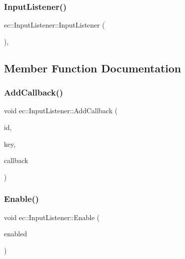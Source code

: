 \mbox{\label{classec_1_1_input_listener_aa44d25c2b2d3ef5e72611831fd66e10c}} 
\subsubsection{\texorpdfstring{Input\+Listener()}{InputListener()}}
{\footnotesize\ttfamily ec\+::\+Input\+Listener\+::\+Input\+Listener (\begin{DoxyParamCaption}{ }\end{DoxyParamCaption})\hspace{0.3cm}{\ttfamily [explicit]}, {\ttfamily [protected]}}



\subsection{Member Function Documentation}
\mbox{\label{classec_1_1_input_listener_abd10663298114e8790d695feab96b188}} 
\subsubsection{\texorpdfstring{Add\+Callback()}{AddCallback()}}
{\footnotesize\ttfamily void ec\+::\+Input\+Listener\+::\+Add\+Callback (\begin{DoxyParamCaption}\item[{const std\+::string \&}]{id,  }\item[{\mbox{\hyperlink{namespaceec_a5de6bdb8c4b2ed6e590e721ec998f964}{Event\+Key\+\_\+T}}}]{key,  }\item[{std\+::function$<$ void()$>$}]{callback }\end{DoxyParamCaption})}

\mbox{\label{classec_1_1_input_listener_abc475ae19a77d3b2f3cf622a23aad123}} 
\subsubsection{\texorpdfstring{Enable()}{Enable()}}
{\footnotesize\ttfamily void ec\+::\+Input\+Listener\+::\+Enable (\begin{DoxyParamCaption}\item[{const bool}]{enabled }\end{DoxyParamCaption})\hspace{0.3cm}{\ttfamily [virtual]}}

